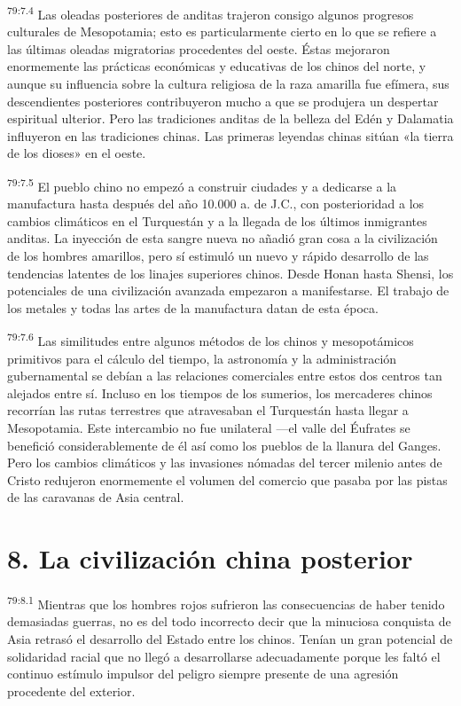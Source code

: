 \par
\textsuperscript{79:7.4} Las oleadas posteriores de anditas trajeron consigo algunos progresos culturales de Mesopotamia; esto es particularmente cierto en lo que se refiere a las últimas oleadas migratorias procedentes del oeste. Éstas mejoraron enormemente las prácticas económicas y educativas de los chinos del norte, y aunque su influencia sobre la cultura religiosa de la raza amarilla fue efímera, sus descendientes posteriores contribuyeron mucho a que se produjera un despertar espiritual ulterior. Pero las tradiciones anditas de la belleza del Edén y Dalamatia influyeron en las tradiciones chinas. Las primeras leyendas chinas sitúan «la tierra de los dioses» en el oeste.

\par
\textsuperscript{79:7.5} El pueblo chino no empezó a construir ciudades y a dedicarse a la manufactura hasta después del año 10.000 a. de J.C., con posterioridad a los cambios climáticos en el Turquestán y a la llegada de los últimos inmigrantes anditas. La inyección de esta sangre nueva no añadió gran cosa a la civilización de los hombres amarillos, pero sí estimuló un nuevo y rápido desarrollo de las tendencias latentes de los linajes superiores chinos. Desde Honan hasta Shensi, los potenciales de una civilización avanzada empezaron a manifestarse. El trabajo de los metales y todas las artes de la manufactura datan de esta época.

\par
\textsuperscript{79:7.6} Las similitudes entre algunos métodos de los chinos y mesopotámicos primitivos para el cálculo del tiempo, la astronomía y la administración gubernamental se debían a las relaciones comerciales entre estos dos centros tan alejados entre sí. Incluso en los tiempos de los sumerios, los mercaderes chinos recorrían las rutas terrestres que atravesaban el Turquestán hasta llegar a Mesopotamia. Este intercambio no fue unilateral ---el valle del Éufrates se benefició considerablemente de él así como los pueblos de la llanura del Ganges. Pero los cambios climáticos y las invasiones nómadas del tercer milenio antes de Cristo redujeron enormemente el volumen del comercio que pasaba por las pistas de las caravanas de Asia central.

\section*{8. La civilización china posterior}
\par
\textsuperscript{79:8.1} Mientras que los hombres rojos sufrieron las consecuencias de haber tenido demasiadas guerras, no es del todo incorrecto decir que la minuciosa conquista de Asia retrasó el desarrollo del Estado entre los chinos. Tenían un gran potencial de solidaridad racial que no llegó a desarrollarse adecuadamente porque les faltó el continuo estímulo impulsor del peligro siempre presente de una agresión procedente del exterior.

